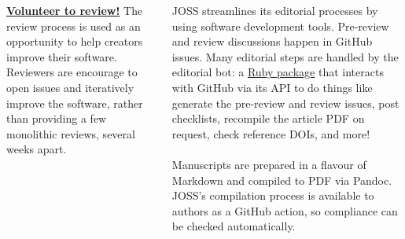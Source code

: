 \documentclass[25pt, a0paper, portrait]{tikzposter}
\begin{document}
\begin{columns}
{  \vspace{1.325em}
  \href{https://reviewers.joss.theoj.org/join}{\textbf{Volunteer to review!}}
  The review process is used as an opportunity to help creators improve their software.
  Reviewers are encourage to open issues and iteratively improve the software, rather
than providing a few monolithic reviews, several weeks apart.}


{JOSS streamlines its editorial processes by using software
  development tools.  Pre-review and review discussions happen in
  GitHub issues.  Many editorial steps are handled by the editorial
  bot: a \href{https://buffy.readthedocs.io/}{Ruby package}
  that interacts with GitHub via its API to do things
  like generate the pre-review and review issues, post checklists,
  recompile the article PDF on request, check reference DOIs, and more! \\
  \\
  Manuscripts are prepared in a flavour of Markdown and compiled to
  PDF via Pandoc.  JOSS's compilation process is available to authors
  as a GitHub action, so compliance can be checked automatically.
}



\end{columns}
\end{document}
